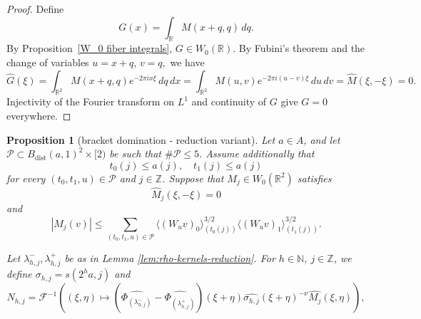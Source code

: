 \documentclass[12pt,reqno]{amsart}
\theoremstyle{plain}
\newtheorem{proposition}[theorem]{Proposition}
\numberwithin{equation}{section}
\theoremstyle{remark}
\newcommand{\using}[1]{}
\newcommand{\Z}{{\mathbb Z}}
\newcommand{\N}{{\mathbb N}}
\DeclareMathOperator{\dist}{dist}
\begin{document}
\begin{proof}
    Define
\[
G(x)=\int_{\mathbb R}M(x+q,q)\,dq.
\]
By Proposition~\ref{W_0 fiber integrals}, \(G\in W_0(\mathbb R)\).
By Fubini's theorem and the change of variables
$ u=x+q, \, v=q, $
we have
\[
\widehat G(\xi)
=
\int_{\mathbb R^2}
M(x+q,q)e^{-2\pi ix\xi}\,dq\,dx
=
\int_{\mathbb R^2}
M(u,v)e^{-2\pi i(u-v)\xi}\,du\,dv=
\widehat M(\xi,-\xi)
=
0.
\]
Injectivity of the Fourier transform on \(L^1\) and continuity of $G$ give
\(G=0\) everywhere.
\end{proof}


\begin{proposition}[bracket domination - reduction variant]
\label{lem:increase-data-bracket-domination}\using{lem:rho-kernels-reduction}\using{two bump estimate}\using{bump triangle}\using{orthogonal decay}\using{convolution vector}\using{lem:affine-diagonal-cancellation-reduction}\using{Properties of distance of sequences}\using{Operations on spaced sequences}
Let \(a\in A\), and let
$
\mathcal P\subset B_{\dist}(a,1)^2\times[2)$ be such that $\#\mathcal P\leq5$. Assume additionally that
\begin{equation}
    \label{E:increase-data-one-sided-scales}
    t_0(j)\leq a(j),
    \quad
    t_1(j)\leq a(j)
\end{equation}
for every \((t_0,t_1,u)\in\mathcal P\) and \(j\in\mathbb Z\).
Suppose that \(M_j\in W_0(\mathbb R^2)\) satisfies
\begin{equation}\label{auto:reduction-diagonal-cancellation}
\widehat M_j(\xi,-\xi)=0
\end{equation}
and
\begin{equation}\label{auto:reduction-kernel-decay}
|M_j(v)|
\leq
\sum_{(t_0,t_1,u)\in\mathcal P}
\langle(W_uv)_0\rangle_{(t_0(j))}^{3/2}
\langle(W_uv)_1\rangle_{(t_1(j))}^{3/2}.
\end{equation}

Let $\lambda_{h,j}^-,\lambda_{h,j}^+$ be as in Lemma \ref{lem:rho-kernels-reduction}.
For $h\in\N$, $j\in \Z$, we define
$
\sigma_{h,j} = s(2^{h} a,j)
$
and
\begin{equation}\label{auto:increase-data-N-kernel}
N_{h,j} =
\mathcal F^{-1}\left((\xi,\eta) \mapsto (\widehat{\Phi_{(\lambda_{h,j}^-)}}-\widehat{\Phi_{(\lambda_{h,j}^+)}})(\xi+\eta) \widehat{\sigma_{h,j}}(\xi+\eta)^{-\nu} \widehat{M_j}(\xi,\eta)\right),
\end{equation}



\end{proposition}
\end{document}
